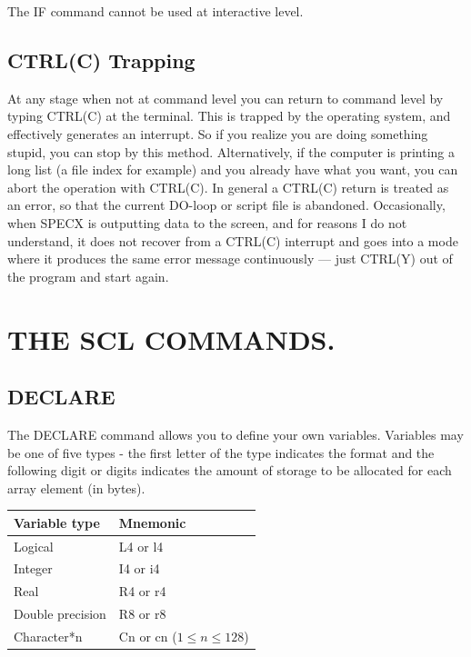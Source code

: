 \documentclass[11pt,twoside]{report}
\begin{document}
The IF command cannot be used at interactive level.

\subsection{CTRL(C) Trapping}

At any stage when not at command level you can return to command level
by typing CTRL(C) at the terminal. This is trapped by the operating system,
and effectively generates an interrupt. So if you realize you are doing
something stupid, you can stop by this method. Alternatively, if the computer
is printing a long list (a file index for example) and you already have what
you want, you can abort the operation with CTRL(C). In general a CTRL(C) return is
treated as an error, so that the current DO-loop or script file is
abandoned. Occasionally, when SPECX is outputting data to the screen, and for
reasons I do not understand, it does not recover from a CTRL(C) interrupt
and goes into a mode where it produces the same error message continuously ---
just CTRL(Y) out of the program and start again. 

\section{THE SCL COMMANDS.}

\subsection{DECLARE}

The DECLARE command allows you to define your own variables. Variables may be
one of five types - the first letter of the type indicates the format and the
following digit or digits indicates the amount of storage to be allocated for
each array element (in bytes).

\begin{center}
\begin{tabular}{|l|l|}  \hline
Variable type & Mnemonic \\
\hline
Logical & L4 or l4 \\
Integer & I4 or i4 \\
Real    & R4 or r4 \\
Double precision & R8 or r8 \\
Character*n & Cn or cn ($1\leq n\leq128$)\\ \hline
\end{tabular}
\end{center}
\end{document}
